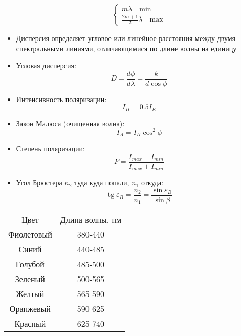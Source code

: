\documentclass[twoside, a4paperpt, fleqn]{extarticle}
\begin{document}
\begin{multicols}{2}
\begin{itemize}
\begin{equation*}
\begin{cases}
                    m \lambda  \quad \text{min} \\
                    \frac{2 m + 1}{2} \lambda \quad \text{max}
                \end{cases}
            \end{equation*}
            \item Дисперсия определяет угловое или линейное расстояния между 
            двумя спектральными линиями, отличающимися по длине волны 
            на единицу
            \item Угловая дисперсия:
            \begin{equation*}
                D = \frac{d \phi}{d \lambda} = \frac{k}{d \cos \phi}
            \end{equation*}
            \item Интенсивность поляризации:
            \begin{equation*}
                I_{\Pi} = 0.5 I_E
            \end{equation*}
            \item Закон Малюса (очищенная волна):
            \begin{equation*}
                I_A = I_{\Pi} \cos^2 \phi
            \end{equation*}
            \item Степень поляризации:
            \begin{equation*}
                P = \frac{I_{max} - I_{min}}{I_{max} + I_{min}}
            \end{equation*}
            \item Угол Брюстера $n_2$ туда куда попали, $n_1$ откуда:
            \begin{equation*}
                \operatorname{tg} \varepsilon_B = \frac{n_2}{n_1} = \frac{\sin \varepsilon_B}{\sin \beta} 
            \end{equation*}
        \end{itemize}
    \end{multicols}
\begin{table}[h!]
    \begin{tabular}{cc}
    Цвет       & Длина волны, нм \\
    Фиолетовый & 380-440         \\
    Синий      & 440-485         \\
    Голубой    & 485-500         \\
    Зеленый    & 500-565         \\
    Желтый     & 565-590         \\
    Оранжевый  & 590-625         \\
    Красный    & 625-740        
    \end{tabular}
    \end{table}
\end{document}
